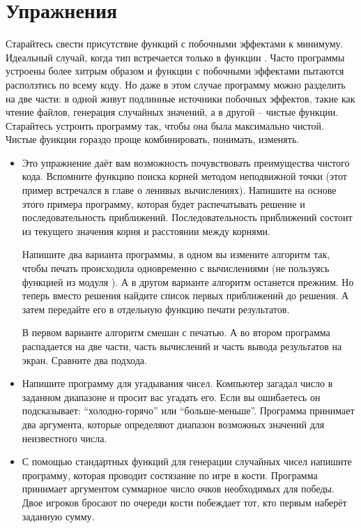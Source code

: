 \section{Упражнения}

Старайтесь свести присутствие функций с побочными эффектами к минимуму.
Идеальный случай, когда тип  встречается только в функции
. Часто программы устроены более хитрым образом и функции с
побочными эффектами пытаются расползтись по всему коду. Но даже в этом
случае программу можно разделить на две части: в одной живут подлинные
источники побочных эффектов, такие как чтение файлов, генерация
случайных значений, а в другой -- чистые функции. Старайтесь устроить
программу так, чтобы она была максимально чистой. Чистые функции гораздо
проще комбинировать, понимать, изменять.

\begin{itemize}
\item
  Это упражнение даёт вам возможность почувствовать преимущества чистого
  кода. Вспомните функцию поиска корней методом неподвижной точки (этот
  пример встречался в главе о ленивых вычислениях). Напишите на основе
  этого примера программу, которая будет распечатывать решение и
  последовательность приближений. Последовательность приближений состоит
  из текущего значения корня и расстоянии между корнями.

  Напишите два варианта программы, в одном вы измените алгоритм так,
  чтобы печать происходила одновременно с вычислениями (не пользуясь
  функцией из модуля ). А в другом варианте алгоритм
  останется прежним. Но теперь вместо решения найдите список первых
  приближений до решения. А затем передайте его в отдельную функцию
  печати результатов.

  В первом варианте алгоритм смешан с печатью. А во втором программа
  распадается на две части, часть вычислений и часть вывода результатов
  на экран. Сравните два подхода.
\item
  Напишите программу для угадывания чисел. Компьютер загадал число в
  заданном диапазоне и просит вас угадать его. Если вы ошибаетесь он
  подсказывает: ``холодно-горячо'' или ``больше-меньше''. Программа
  принимает два аргумента, которые определяют диапазон возможных
  значений для неизвестного числа.
\item
  С помощью стандартных функций для генерации случайных чисел напишите
  программу, которая проводит состязание по игре в кости. Программа
  принимает аргументом суммарное число очков необходимых для победы.
  Двое игроков бросают по очереди кости побеждает тот, кто первым
  наберёт заданную сумму.


\end{itemize}
